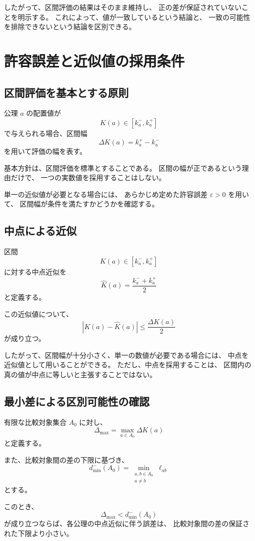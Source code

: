 \documentclass[a4paper,12pt]{article}
\begin{document}
したがって、区間評価の結果はそのまま維持し、
正の差が保証されていないことを明示する。
これによって、値が一致しているという結論と、
一致の可能性を排除できないという結論を区別できる。

\section{許容誤差と近似値の採用条件}

\subsection{区間評価を基本とする原則}

公理 $a$ の配置値が
\[
    K(a)\in[k_a^-,k_a^+]
\]
で与えられる場合、区間幅
\[
    \Delta K(a)=k_a^+-k_a^-
\]
を用いて評価の幅を表す。

基本方針は、区間評価を標準とすることである。
区間の幅が正であるという理由だけで、
一つの実数値を採用することはしない。

単一の近似値が必要となる場合には、
あらかじめ定めた許容誤差 $\varepsilon>0$ を用いて、
区間幅が条件を満たすかどうかを確認する。

\subsection{中点による近似}

区間
\[
    K(a)\in[k_a^-,k_a^+]
\]
に対する中点近似を
\[
    \widehat{K}(a)
    =
    \frac{k_a^-+k_a^+}{2}
\]
と定義する。

この近似値について、
\[
    |K(a)-\widehat{K}(a)|
    \leq\frac{\Delta K(a)}{2}
\]
が成り立つ。

したがって、区間幅が十分小さく、単一の数値が必要である場合には、
中点を近似値として用いることができる。
ただし、中点を採用することは、
区間内の真の値が中点に等しいと主張することではない。

\subsection{最小差による区別可能性の確認}

有限な比較対象集合 $A_0$ に対し、
\[
    \Delta_{\max}
    =
    \max_{a\in A_0}\Delta K(a)
\]
と定義する。

また、比較対象間の差の下限に基づき、
\[
    d_{\min}^-(A_0)
    =
    \min_{\substack{a,b\in A_0\\a\ne b}}\ell_{ab}
\]
とする。

このとき、
\[
    \Delta_{\max}<d_{\min}^-(A_0)
\]
が成り立つならば、各公理の中点近似に伴う誤差は、
比較対象間の差の保証された下限より小さい。
\end{document}
